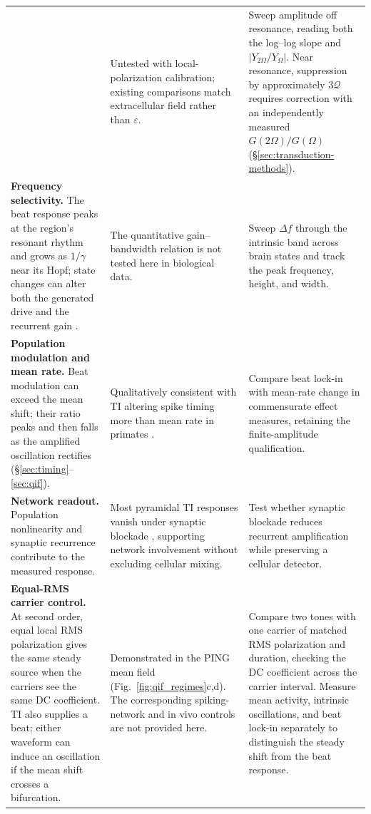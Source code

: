 \documentclass[11pt,a4paper]{article}
\newif\ifsupp
\providecommand{\DIFaddtex}[1]{{\protect\color{blue} \sf #1}} %
\providecommand{\DIFaddend}{} %
\providecommand{\DIFadd}[1]{\texorpdfstring{\DIFaddtex{#1}}{#1}} %
\begin{document}
\begin{longtable}{@{}>{\raggedright\arraybackslash}p{}
 >{\raggedright\arraybackslash}p{}
 >{\raggedright\arraybackslash}p{}@{}}
{}& \DIFadd{Untested with local-polarization calibration; existing comparisons match
extracellular field rather than $\varepsilon$.
}& \DIFadd{Sweep amplitude off resonance, reading both the log--log slope and
$|Y_{2\Omega}/Y_\Omega|$. Near resonance, suppression by approximately
$3\mathcal Q$ requires correction with an independently measured
$G(2\Omega)/G(\Omega)$ (\S\ref{sec:transduction-methods}). }\\[4pt]
\DIFadd{\textbf{Frequency selectivity.} The beat response peaks at the region's resonant
rhythm and grows as $1/\gamma$ near its Hopf; state changes can alter both the
generated drive and the recurrent gain \cite{ruffini2025cfc}.
}& \DIFadd{The quantitative gain--bandwidth relation is not tested here in biological data.
}& \DIFadd{Sweep $\Delta f$ through the intrinsic band across brain states and track the
peak frequency, height, and width. }\\[4pt]
\DIFadd{\textbf{Population modulation and mean rate.} Beat modulation can exceed the mean shift; their ratio
peaks and then falls as the amplified oscillation rectifies
(\S\ref{sec:timing}--\ref{sec:qif}).
}& \DIFadd{Qualitatively consistent with TI altering spike timing more than mean rate in
primates \cite{vieira2024}.
}& \DIFadd{Compare beat lock-in with mean-rate change in commensurate effect measures,
retaining the finite-amplitude qualification. }\\[4pt]
\DIFadd{\textbf{Network readout.} Population nonlinearity and synaptic recurrence contribute
to the measured response.
}& \DIFadd{Most pyramidal TI responses vanish under synaptic blockade \cite{caldas2024},
supporting network involvement without excluding cellular mixing.
}& \DIFadd{Test whether synaptic blockade reduces recurrent amplification while preserving
a cellular detector. }\\[4pt]
\DIFadd{\textbf{Equal-RMS carrier control.} At second order, equal local RMS
polarization gives the same steady source when the carriers see the same DC
coefficient. TI also supplies a beat; either waveform can induce an oscillation
if the mean shift crosses a bifurcation.
}& \DIFadd{Demonstrated in the PING mean field (Fig.~\ref{fig:qif_regimes}c,d).
The corresponding spiking-network and in vivo controls are not provided here.
}& \DIFadd{Compare two tones with one carrier of matched RMS polarization and duration,
checking the DC coefficient across the carrier interval. Measure mean activity,
intrinsic oscillations, and beat lock-in separately to distinguish the steady
shift from the beat response. }\\
\end{longtable}
\endgroup


\ifsupp
\clearpage


\fi
\fi
 \DIFaddend
\end{document}
